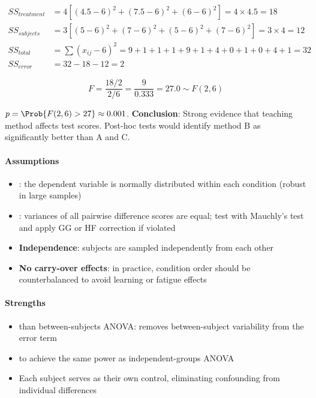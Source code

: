 \begin{align*}
    SS_{treatment} &= 4\left[(4.5-6)^2 + (7.5-6)^2 + (6-6)^2\right] = 4 \times 4.5 = 18 \\
    SS_{subjects}  &= 3\left[(5-6)^2 + (7-6)^2 + (5-6)^2 + (7-6)^2\right] = 3 \times 4 = 12 \\
    SS_{total}     &= \textstyle\sum(x_{ij}-6)^2 = 9+1+1+1+9+1+4+0+1+0+4+1 = 32 \\
    SS_{error}     &= 32 - 18 - 12 = 2
\end{align*}

$$F = \frac{18/2}{2/6} = \frac{9}{0.333} = 27.0 \sim F(2, 6)$$

$p = \Prob{F(2,6) > 27} \approx 0.001$. \textbf{Conclusion}: Strong evidence that
teaching method affects test scores. Post-hoc tests would identify method B as
significantly better than A and C.

\paragraph{Assumptions}
\begin{itemize}
    \item {}: the dependent variable is normally distributed within each
        condition (robust in large samples)
    \item {}: variances of all pairwise difference scores are equal; test
        with Mauchly's test and apply GG or HF correction if violated
    \item \textbf{Independence}: subjects are sampled independently from each other
    \item \textbf{No carry-over effects}: in practice, condition order should be
        counterbalanced to avoid learning or fatigue effects
\end{itemize}

\paragraph{Strengths}
\begin{itemize}
    \item {} than between-subjects ANOVA: removes
        between-subject variability from the error term
    \item {} to achieve the same power as independent-groups ANOVA
    \item Each subject serves as their own control, eliminating confounding from
        individual differences
\end{itemize}

